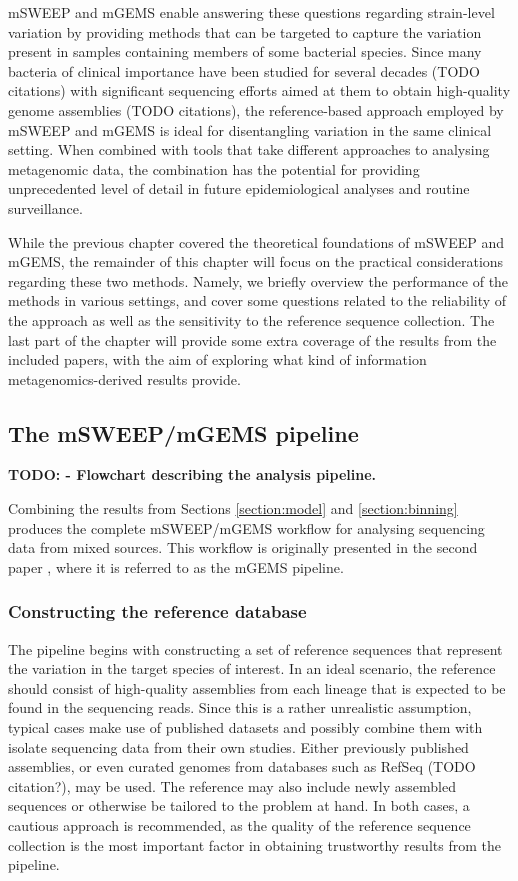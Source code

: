 \documentclass[officiallayout]{tktla}
\begin{document}
mSWEEP and mGEMS enable answering these questions regarding
strain-level variation by providing methods that can be targeted to
capture the variation present in samples containing members of some
bacterial species. Since many bacteria of clinical importance have
been studied for several decades (TODO citations) with significant
sequencing efforts aimed at them to obtain high-quality genome
assemblies (TODO citations), the reference-based approach employed by
mSWEEP and mGEMS is ideal for disentangling variation in the same
clinical setting. When combined with tools that take different
approaches to analysing metagenomic data, the combination has the
potential for providing unprecedented level of detail in future
epidemiological analyses and routine surveillance.

While the previous chapter covered the theoretical foundations of
mSWEEP and mGEMS, the remainder of this chapter will focus on the
practical considerations regarding these two methods. Namely, we
briefly overview the performance of the methods in various settings,
and cover some questions related to the reliability of the approach as
well as the sensitivity to the reference sequence collection. The last
part of the chapter will provide some extra coverage of the results
from the included papers, with the aim of exploring what kind of
information metagenomics-derived results provide.

\subsection{The mSWEEP/mGEMS pipeline}
\textbf{TODO: - Flowchart describing the analysis pipeline.}

Combining the results from Sections \ref{section:model} and
\ref{section:binning} produces the complete mSWEEP/mGEMS workflow for
analysing sequencing data from mixed sources. This workflow is
originally presented in the second paper
\citep{maklin_bacterial_2021}, where it is referred to as the mGEMS
pipeline.

\subsubsection{Constructing the reference database}

The pipeline begins with constructing a set of reference sequences
that represent the variation in the target species of interest. In an
ideal scenario, the reference should consist of high-quality
assemblies from each lineage that is expected to be found in the
sequencing reads. Since this is a rather unrealistic assumption,
typical cases make use of published datasets and possibly combine them
with isolate sequencing data from their own studies. Either previously
published assemblies, or even curated genomes from databases such as
RefSeq (TODO citation?), may be used. The reference may also include
newly assembled sequences or otherwise be tailored to the problem at
hand. In both cases, a cautious approach is recommended, as the
quality of the reference sequence collection is the most important
factor in obtaining trustworthy results from the pipeline.
\end{document}
